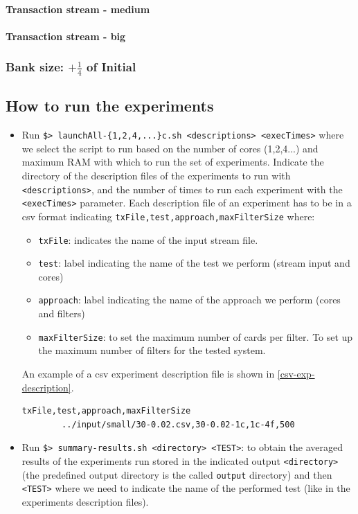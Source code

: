 \paragraph{Transaction stream - medium\\}

\paragraph{Transaction stream - big\\}

\subsubsection{Bank size: $+\frac{1}{4}$ of Initial}

\subsection{How to run the experiments}

\begin{itemize}
    \item Run \texttt{\$> launchAll-\{1,2,4,...\}c.sh <descriptions> <execTimes>} where we select the script to run based on the number of cores (1,2,4...) and maximum RAM with which to run the set of experiments. Indicate the directory of the description files of the experiments to run with \texttt{<descriptions>}, and the number of times to run each experiment with the \texttt{<execTimes>} parameter.
    Each description file of an experiment has to be in a csv format indicating \texttt{txFile,test,approach,maxFilterSize} where:
    \begin{itemize}
        \item \texttt{txFile}: indicates the name of the input stream file.
        \item \texttt{test}: label indicating the name of the test we perform (stream input and cores)
        \item \texttt{approach}: label indicating the name of the approach we perform (cores and filters)
        \item \texttt{maxFilterSize}: to set the maximum number of cards per filter. To set up the maximum number of filters for the tested system.
    \end{itemize}
    An example of a csv experiment description file is shown in \ref{csv-exp-description}.
    \begin{center}
    \lstset{style=cypherStyle}
    \begin{lstlisting}[caption={30-0.02-1c-4f}, label={csv-exp-description}]
        txFile,test,approach,maxFilterSize
        ../input/small/30-0.02.csv,30-0.02-1c,1c-4f,500
    \end{lstlisting}
    \end{center}
    \item Run \texttt{\$> summary-results.sh <directory> <TEST>}: to obtain the averaged results of the experiments run stored in the indicated output \texttt{<directory>} (the predefined output directory is the called \texttt{output} directory) and then \texttt{<TEST>} where we need to indicate the name of the performed test (like in the experiments description files).
\end{itemize}